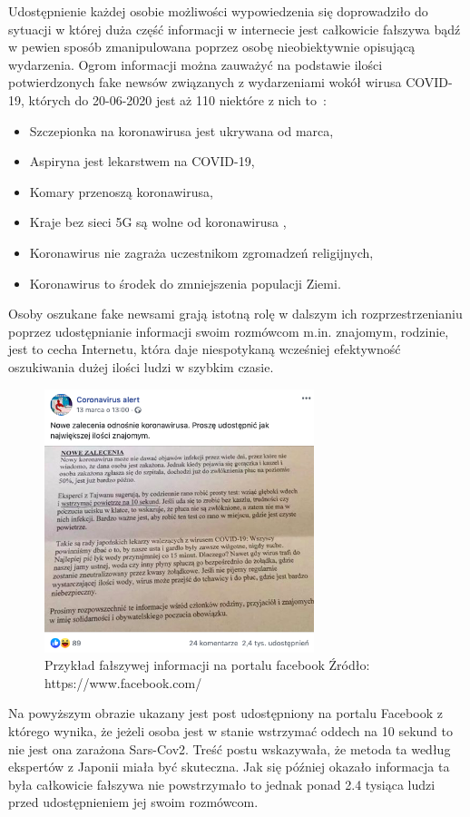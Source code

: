 Udostępnienie każdej osobie możliwości wypowiedzenia się doprowadziło do sytuacji w której duża część informacji w internecie
jest całkowicie fałszywa bądź w pewien sposób zmanipulowana poprzez osobę nieobiektywnie opisującą wydarzenia. Ogrom informacji
można zauważyć na podstawie ilości potwierdzonych fake newsów związanych z wydarzeniami wokół wirusa COVID-19, których do 
20-06-2020 jest aż 110 niektóre z nich to~\cite{Korona}:
\begin{itemize}
    \item Szczepionka na koronawirusa jest ukrywana od marca,
    \item Aspiryna jest lekarstwem na COVID-19,
    \item Komary przenoszą koronawirusa,
    \item Kraje bez sieci 5G są wolne od koronawirusa ,
    \item Koronawirus nie zagraża uczestnikom zgromadzeń religijnych,
    \item Koronawirus to środek do zmniejszenia populacji Ziemi.
\end{itemize}
Osoby oszukane fake newsami grają istotną rolę w dalszym ich rozprzestrzenianiu poprzez udostępnianie informacji swoim rozmówcom
m.in. znajomym, rodzinie, jest to cecha Internetu, która daje niespotykaną wcześniej efektywność oszukiwania dużej ilości ludzi w szybkim
czasie. 
\begin{figure}[h!]
    \centering
    \includegraphics[width=0.7\textwidth]{./Img/cvfakenews.png}
    \caption{Przykład fałszywej informacji na portalu facebook Źródło: https://www.facebook.com/}
\end{figure}

Na powyższym obrazie ukazany jest post udostępniony na portalu Facebook z którego wynika, że jeżeli osoba jest w stanie wstrzymać 
oddech na 10 sekund to nie jest ona zarażona Sars-Cov2. Treść postu wskazywała, że metoda ta według ekspertów 
z Japonii miała być skuteczna. Jak się później okazało informacja ta była całkowicie fałszywa nie powstrzymało to jednak ponad 2.4 tysiąca ludzi przed 
udostępnieniem jej swoim rozmówcom.~\cite{KoronaOddech} 

